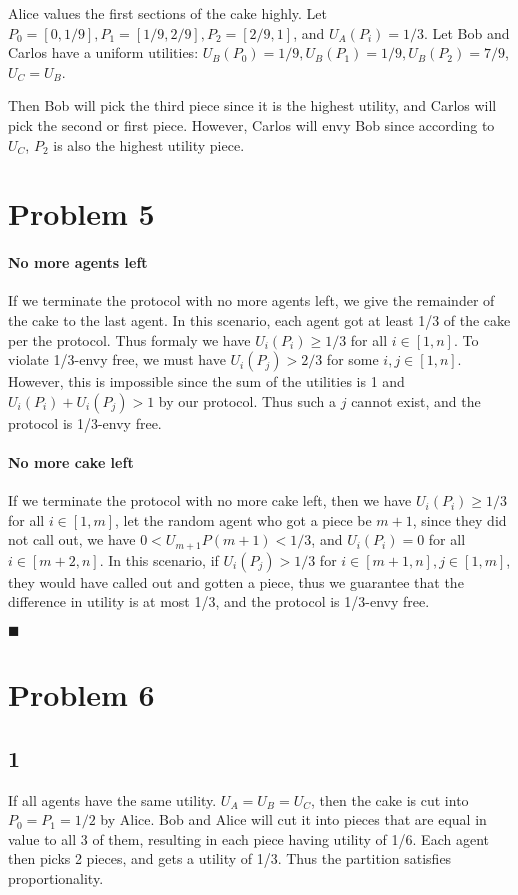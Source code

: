 \documentclass[12pt]{article}
\begin{document}
Alice values the first sections of the cake highly. Let $P_0 = [0, 1/9], P_1=[1/9, 2/9], P_2=[2/9, 1]$, and 
$U_A(P_i) = 1/3$. Let Bob and Carlos have a uniform utilities: $U_B(P_0) = 1/9, U_B(P_1) = 1/9, U_B(P_2) = 7/9$, $U_C = U_B$.

Then Bob will pick the third piece since it is the highest utility, and Carlos will pick the second or first piece. However, 
Carlos will envy Bob since according to $U_C$, $P_2$ is also the highest utility piece.

\newpage


\section*{Problem 5}
\paragraph*{No more agents left}
If we terminate the protocol with no more agents left, we give the remainder of the cake to the last agent. In this scenario, each agent got at least 1/3 of the cake 
per the protocol. Thus formaly we have $U_i(P_i) \geq 1/3$ for all $i \in [1, n]$. To violate 1/3-envy free, 
we must have $U_i(P_j) > 2/3$ for some $i, j \in [1, n]$. However, this is impossible since the sum of the utilities is 
1 and $U_i(P_i) + U_i(P_j) > 1$ by our protocol. Thus such a $j$ cannot exist, and the protocol is 1/3-envy free.

\paragraph*{No more cake left}
If we terminate the protocol with no more cake left, then we have $U_i(P_i) \geq 1/3$ for all $i \in [1, m]$, let the 
random agent who got a piece be $m+1$, since they did not call out, we have $0<U_{m+1}P(m+1)<1/3$, and $U_i(P_i) = 0$ for all $i \in [m+2, n]$.
In this scenario, if $U_i(P_j)>1/3$ for $i \in [m+1, n], j \in [1, m]$, they would have called out and gotten a piece, thus 
we guarantee that the difference in utility is at most 1/3, and the protocol is 1/3-envy free.

$\blacksquare$
\newpage


\section*{Problem 6}
\subsection*{1}
If all agents have the same utility. $U_A = U_B = U_C$, then the cake is cut into 
$P_0 = P_1 = 1/2$ by Alice. Bob and Alice will cut it into pieces that are equal in value 
to all 3 of them, resulting in each piece having utility of 1/6. Each agent then picks 2 pieces, 
and gets a utility of 1/3. Thus the partition satisfies proportionality.
\end{document}
